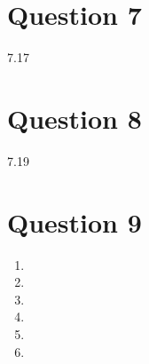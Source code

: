 \documentclass{article}
\begin{document}
\section*{Question 7}
7.17


\section*{Question 8}
7.19


\section*{Question 9}
\begin{enumerate}
	\item 
	
	
	\item 
	
	
	\item 
	
	
	\item 
	
	
	\item 
	
	
	\item 
	
	
\end{enumerate}

\end{document}
